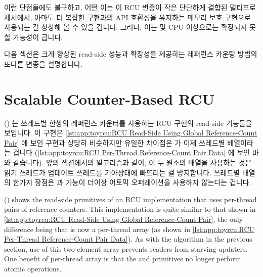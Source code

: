 이런 단점들에도 불구하고, 어떤 이는 이 RCU 변종이 작은 단단하게 결합된
멀티프로세서에서, 아마도 더 복잡한 구현과의 API 호환성을 유지하는 메모리 보호
구현으로 사용되는 걸 상상해 볼 수 있을 겁니다.
그러나, 이는 몇 CPU 이상으로는 확장되지 못할 가능성이 큽니다.

다음 섹션은 크게 향상된 read-side 성능과 확장성을 제공하는 레퍼런스 카운팅
방법의 또다른 변종을 설명합니다.

\iffalse

Despite these shortcomings, one could imagine this variant
of RCU being used on small tightly coupled multiprocessors,
perhaps as a memory-conserving implementation that maintains
API compatibility with more complex implementations.
However, it would not likely scale well beyond a few CPUs.

The next section describes yet another variation on the reference-counting
scheme that provides greatly improved read-side performance and scalability.

\fi

\section{Scalable Counter-Based RCU}
\label{sec:app:toyrcu:Scalable Counter-Based RCU}

()
는 쓰레드별 한쌍의 레퍼런스 카운터를 사용하는 RCU 구현의 read-side 기능들을
보입니다.
이 구현은
\cref{lst:app:toyrcu:RCU Read-Side Using Global Reference-Count Pair}
에 보인 구현과 상당히 비슷하지만 유일한 차이점은  가 이제
쓰레드별 배열이라는 겁니다
(\cref{lst:app:toyrcu:RCU Per-Thread Reference-Count Pair Data} 에 보인 바와
같습니다).
앞의 섹션에서의 알고리즘과 같이, 이 두 원소의 배열을 사용하는 것은 읽기
쓰레드가 업데이트 쓰레드를 기아상태에 빠뜨리는 걸 방지합니다.
쓰레드별  배열의 한가지 장점은  과
 기능이 더이상 어토믹 오퍼레이션을 사용하지 않는다는
겁니다.

\iffalse

()
shows the read-side primitives of an RCU implementation that uses per-thread
pairs of reference counters.
This implementation is quite similar to that shown in
\cref{lst:app:toyrcu:RCU Read-Side Using Global Reference-Count Pair},
the only difference being that  is now a per-thread
array (as shown in
\cref{lst:app:toyrcu:RCU Per-Thread Reference-Count Pair Data}).
As with the algorithm in the previous section, use of this two-element
array prevents readers from starving updaters.
One benefit of per-thread  array is that the
 and  primitives no longer
perform atomic operations.

